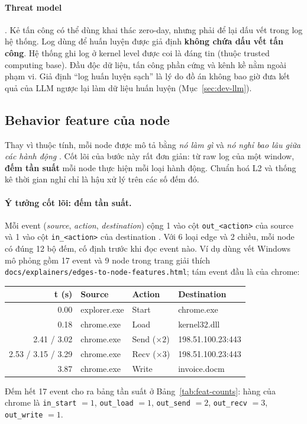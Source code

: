 \paragraph{Threat model} \cite[§3]{aly2025ocrapt}.
Kẻ tấn công có thể dùng khai thác zero-day, nhưng phải để lại dấu vết trong log hệ thống. Log dùng để huấn luyện được giả định \textbf{không chứa dấu vết tấn công}. Hệ thống ghi log ở kernel level được coi là đáng tin (thuộc trusted computing base). Đầu độc dữ liệu, tấn công phần cứng và kênh kề nằm ngoài phạm vi. Giả định ``log huấn luyện sạch'' là lý do đồ án không bao giờ đưa kết quả của LLM ngược lại làm dữ liệu huấn luyện (Mục~\ref{sec:dev-llm}).

\subsection{Behavior feature của node}
\label{sec:theory-features}

Thay vì thuộc tính, mỗi node được mô tả bằng \emph{nó làm gì} và \emph{nó nghỉ bao lâu giữa các hành động} \cite[§5.1.2]{aly2025ocrapt}. Cốt lõi của bước này rất đơn giản: từ raw log của một window, \textbf{đếm tần suất} mỗi node thực hiện mỗi loại hành động. Chuẩn hoá L2 và thống kê thời gian nghỉ chỉ là hậu xử lý trên các số đếm đó.

\paragraph{Ý tưởng cốt lõi: đếm tần suất.}
Mỗi event (\emph{source}, \emph{action}, \emph{destination}) cộng 1 vào cột \texttt{out\_<action>} của source và 1 vào cột \texttt{in\_<action>} của destination \cite[\texttt{encode\_to\_PyG.py} l.139--148]{ocrapt_repo}. Với 6 loại edge và 2 chiều, mỗi node có đúng 12 bộ đếm, cố định trước khi đọc event nào. Ví dụ dùng vết Windows mô phỏng gồm 17 event và 9 node trong trang giải thích \texttt{docs/explainers/edges-to-node-features.html}; tám event đầu là của chrome:
\begin{center}
\small
\begin{tabular}{r l l l}
\toprule
\textbf{t (s)} & \textbf{Source} & \textbf{Action} & \textbf{Destination} \\
\midrule
0.00 & explorer.exe & Start & chrome.exe \\
0.18 & chrome.exe & Load & kernel32.dll \\
2.41 / 3.02 & chrome.exe & Send ($\times 2$) & 198.51.100.23:443 \\
2.53 / 3.15 / 3.29 & chrome.exe & Recv ($\times 3$) & 198.51.100.23:443 \\
3.87 & chrome.exe & Write & invoice.docm \\
\bottomrule
\end{tabular}
\end{center}
Đếm hết 17 event cho ra bảng tần suất ở Bảng~\ref{tab:feat-counts}: hàng của chrome là \texttt{in\_start} $= 1$, \texttt{out\_load} $= 1$, \texttt{out\_send} $= 2$, \texttt{out\_recv} $= 3$, \texttt{out\_write} $= 1$.

